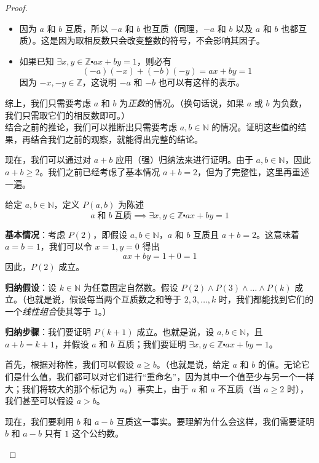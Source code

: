 \begin{proof}
\begin{tcolorbox}
            \begin{itemize}
                \item 因为 $a$ 和 $b$ 互质，所以 $-a$ 和 $b$ 也互质（同理，$-a$ 和 $b$ 以及 $a$ 和 $b$ 也都互质）。这是因为取相反数只会改变整数的符号，不会影响其因子。
                \item 如果已知 $\exists x, y \in \mathbb{Z} \centerdot ax + by = 1$，则必有
                    \[(-a)(-x) + (-b)(-y) = ax + by = 1\]
                    因为 $-x,-y \in \mathbb{Z}$，这说明 $-a$ 和 $-b$ 也可以有这样的表示。
            \end{itemize}
            综上，我们只需要考虑 $a$ 和 $b$ 为\emph{正数}的情况。（换句话说，如果 $a$ 或 $b$ 为负数，我们只需取它们的相反数即可。）\\

            结合之前的推论，我们可以推断出只需要考虑 $a,b \in \mathbb{N}$ 的情况。证明这些值的结果，再结合我们之前的观察，就能得出完整的结论。

            现在，我们可以通过对 $a + b$ 应用（强）归纳法来进行证明。由于 $a,b \in \mathbb{N}$，因此 $a + b \ge 2$。我们之前已经考虑了基本情况 $a + b = 2$，但为了完整性，这里再重述一遍。

            给定 $a,b \in \mathbb{N}$，定义 $P(a,b)$ 为陈述
            \[a \;\text{和}\; b \;\text{互质} \implies \exists x, y \in \mathbb{Z} \centerdot ax + by = 1\]

            \textbf{基本情况}：考虑 $P(2)$，即假设 $a,b \in \mathbb{N}$，$a$ 和 $b$ 互质且 $a+b=2$。这意味着 $a=b=1$，我们可以令 $x=1, y=0$ 得出
            \[ax + by = 1 + 0 = 1\]
            因此，$P(2)$ 成立。

            \textbf{归纳假设}：设 $k \in \mathbb{N}$ 为任意固定自然数。假设 $P(2) \land P(3) \land \dots \land P(k)$ 成立。（也就是说，假设每当两个互质数之和等于 $2,3, \dots, k$ 时，我们都能找到它们的一个\emph{线性组合}使其等于 $1$。）

            \textbf{归纳步骤}：我们要证明 $P(k+1)$ 成立。也就是说，设 $a, b \in \mathbb{N}$，且 $a + b = k + 1$，并假设 $a$ 和 $b$ 互质；我们要证明 $\exists x, y \in \mathbb{Z} \centerdot ax + by = 1$。

            首先，根据对称性，我们可以假设 $a \ge b$。（也就是说，给定 $a$ 和 $b$ 的值。无论它们是什么值，我们都可以对它们进行``重命名''，因为其中一个值至少与另一个一样大；我们将较大的那个标记为 $a$。）事实上，由于 $a$ 和 $a$ 不互质（当 $a \ge 2$ 时），我们甚至可以假设 $a > b$。

            现在，我们要利用 $b$ 和 $a - b$ 互质这一事实。要理解为什么会这样，我们需要证明 $b$ 和 $a - b$ 只有 $1$ 这个公约数。


\end{tcolorbox}
\end{proof}
